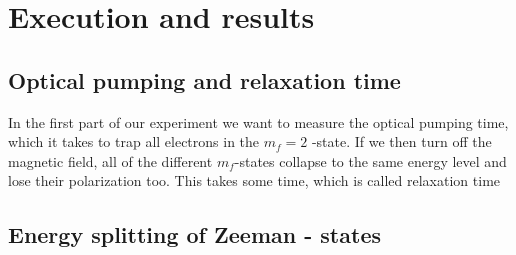\section{Execution and results}
\subsection{Optical pumping and relaxation time}
In the first part of our experiment we want to measure the optical pumping time, which it takes to trap all electrons in the $m_f = 2$ -state. If we then turn off the magnetic field, all of the different $m_f$-states collapse to the same energy level and lose their polarization too. This takes some time, which is called relaxation time






\subsection{Energy splitting of Zeeman - states}